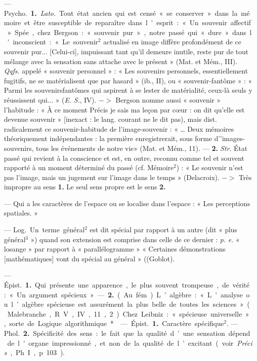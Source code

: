 \begin{itemize}[leftmargin=1cm, label=, itemsep=1pt]
 — \si{Psycho.} {\bf 1.} {\it Lato.} Tout état
ancien qui est censé « se conserver »
dans la mémoire et être susceptible
de reparaître dans l'esprit : « Un
souvenir affectif » Spée., chez
Bergson : « souvenir pur », notre
passé qui « dure» dans l'inconscient :
« Le souvenir$^2$ actualisé en image
diffère profondément de ce souvenir pur... [Celui-ci], impuissant
tant qu'il demeure inutile, reste
pur de tout mélange avec la sensation sans attache avec le présent »
(Mat. et Mém., III). {\it Qqfs.} appelé
« souvenir personnel » : « Les souvenirs personnels, essentiellement
fugitifs, ne se matérialisent que par
hasard » (ib., II), ou « souvenir-fantôme » : « Parmi les souvenirsfantômes qui aspirent à se lester de
matérialité, ceux-là seuls y réussissent qui... » ({\it E. S.}, IV). $->$ Bergson
nomme aussi « souvenir » l'habitude : « À ce moment Précis je sais
ma leçon par cœur : on dit qu’elle
est devenue souvenir » [inexact : le
lang. courant ne le dit pas), mais
dist. radicalement ce souvenir-habitude de l'image-souvenir : « … Deux
mémoires théoriquement indépendantes : la première enregistrerait,
sous forme d’'images-souvenirs, tous
les événements de notre vie» (Mat. et
Mém., 11). — {\bf 2.} {\it Str.} État passé qui
revient à la conscience et est, en
outre, reconnu comme tel et souvent rapporté à un moment déterminé du passé (cf. Mémoire$^2$) : « Le
souvenir n’est pas l’image, mais un
jugement sur l’image dans le temps »
(Delacroix). $->$ Très impropre au
sens {\bf 1.} Le seul sens propre est le
sens {\bf 2.}

 — Qui a les caractères de
l’espace ou se localise dans l’espace :
« Les perceptions spatiales. »

 — \si{Log.} Un terme général$^2$ est
dit spécial par rapport à un autre
(dit « plus général$^3$ ») quand son
extension est comprise dans celle
de ce dernier : {\it p. e.} « losange » par
rapport à « parallélogramme »
« Certaines démonstrations [mathématiques] vont du spécial au
général » ((Goblot).

 — \si{Épist.} {\bf 1.} Qui présente une
apparence, le plus souvent trompeuse, de vérité : « Un argument
spécieux ». — {\bf 2.} (Au fém.). L’algèbre :
« L'analyse ou l’algèbre spécieuse est assurément la plus belle
de toutes les sciences » (Malebranche, R. V., IV, 11, 2). Chez Leibniz :
« spécieuse universelle », sorte de
Logique algorithmique*.

 — \si{Épist.} {\bf 1.} Caractère spécifique$^2$. — \si{Phol.} {\bf 2.} Spécificité des
sens : le fait que la qualité d’une
sensation dépend de l'organe impressionné, et non de la qualité de
l’excitant (voir {\it Précis}, Ph. I, p. 103).


\end{itemize}
